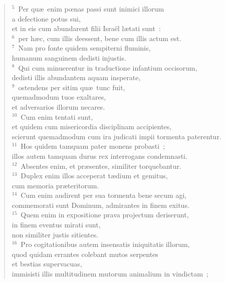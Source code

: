 \begin{flushleft}\begin{verse}${}^{5}$~Per qu\ae\ enim pœnas passi sunt inimici illorum\\ a defectione potus sui,\\ et in eis cum abundarent filii Isra\"el l\ae tati sunt~:\\
${}^{6}$~per h\ae c, cum illis deessent, bene cum illis actum est.\\
${}^{7}$~Nam pro fonte quidem sempiterni fluminis,\\ humanum sanguinem dedisti injustis.\\
${}^{8}$~Qui cum minuerentur in traductione infantium occisorum,\\ dedisti illis abundantem aquam insperate,\\
${}^{9}$~ostendens per sitim qu\ae\ tunc fuit,\\ quemadmodum tuos exaltares,\\ et adversarios illorum necares.\\
${}^{10}$~Cum enim tentati sunt,\\ et quidem cum misericordia disciplinam accipientes,\\ scierunt quemadmodum cum ira judicati impii tormenta paterentur.\\
${}^{11}$~Hos quidem tamquam pater monens probasti~;\\ illos autem tamquam durus rex interrogans condemnasti.\\
${}^{12}$~Absentes enim, et pr\ae sentes, similiter torquebantur.\\
${}^{13}$~Duplex enim illos acceperat t\ae dium et gemitus,\\ cum memoria pr\ae teritorum.\\
${}^{14}$~Cum enim audirent per sua tormenta bene secum agi,\\ commemorati sunt Dominum, admirantes in finem exitus.\\
${}^{15}$~Quem enim in expositione prava projectum deriserunt,\\ in finem eventus mirati sunt,\\ non similiter justis sitientes.\\
${}^{16}$~Pro cogitationibus autem insensatis iniquitatis illorum,\\ quod quidam errantes colebant mutos serpentes\\ et bestias supervacuas,\\ immisisti illis multitudinem mutorum animalium in vindictam~;\\

\end{verse}
\end{flushleft}
